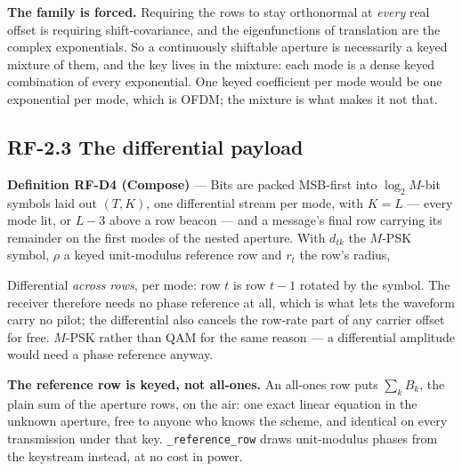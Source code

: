 \documentclass[10pt,letterpaper,twocolumn]{article}
\begin{document}
\textbf{The family is forced.} Requiring the rows to stay orthonormal at \emph{every} real offset is requiring shift-covariance, and the eigenfunctions of translation are the complex exponentials. So a continuously shiftable aperture is necessarily a keyed mixture of them, and the key lives in the mixture: each mode is a dense keyed combination of every exponential. One keyed coefficient per mode would be one exponential per mode, which is OFDM; the mixture is what makes it not that.

\subsection{RF-2.3 The differential payload}\label{rf-23-the-differential-payload}

\textbf{Definition RF-D4 (Compose)} --- Bits are packed MSB-first into \(\log_2 M\)-bit symbols laid out \((T, K)\), one differential stream per mode, with \(K = L\) --- every mode lit, or \(L - 3\) above a row beacon --- and a message's final row carrying its remainder on the first modes of the nested aperture. With \(d_{tk}\) the \(M\)-PSK symbol, \(\rho\) a keyed unit-modulus reference row and \(r_t\) the row's radius,

Differential \emph{across rows}, per mode: row \(t\) is row \(t-1\) rotated by the symbol. The receiver therefore needs no phase reference at all, which is what lets the waveform carry no pilot; the differential also cancels the row-rate part of any carrier offset for free. \(M\)-PSK rather than QAM for the same reason --- a differential amplitude would need a phase reference anyway.

\textbf{The reference row is keyed, not all-ones.} An all-ones row puts \(\sum_k B_k\), the plain sum of the aperture rows, on the air: one exact linear equation in the unknown aperture, free to anyone who knows the scheme, and identical on every transmission under that key. \texttt{\_\allowbreak{}reference\_\allowbreak{}row} draws unit-modulus phases from the keystream instead, at no cost in power.
\end{document}

